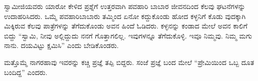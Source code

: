 ಸ್ವಾಮೀಜಿಯವರು ಯಾರೋ ಕೇಳಿದ ಪ್ರಶ್ನೆಗೆ ಉತ್ತರವಾಗಿ ಪವಹಾರಿ ಬಾಬಾರ ಜೀವನದಿಂದ ಕೆಲವು ಘಟನೆಗಳನ್ನು ಉದಾಹರಿಸಿದರು. ಒಮ್ಮೆ ಪವಹಾರಿಬಾಬಾರು ತಮ್ಮಿಂದ ಏನೋ ಕದ್ದುಕೊಂಡು ಹೋದ ಕಳ್ಳನಿಗೆ ಕೊಡು ವುದಕ್ಕಾಗಿ ಮಿಕ್ಕಿರುವ ಕೆಲವು ಪಾತ್ರೆಗಳನ್ನು ತೆಗೆದುಕೊಂಡು ಅವನ ಹಿಂದೆ ಓಡಿದರು. ಕಳ್ಳನನ್ನು ಕಂಡಾದ ಮೇಲೆ ಅವನ ಕಾಲಿಗೆ ಬಿದ್ದು “ಸ್ವಾಮಿ, ನೀವು ಅಲ್ಲಿದ್ದುದು ನನಗೆ ಗೊತ್ತಾಗಲಿಲ್ಲ. ಇವುಗಳನ್ನೂ ತೆಗೆದುಕೊಳ್ಳಿ. ಇವೂ ನಿಮ್ಮವು. ನಿಮ್ಮ ಮಗು ನಾನು. ದಯವಿಟ್ಟು ಕ್ಷಮಿಸಿ” ಎಂದು ಬೇಡಿಕೊಂಡರು.

ಮತ್ತೊಮ್ಮೆ ನಾಗರಹಾವು ಇವರನ್ನು ಕಚ್ಚಿ ಪ್ರಜ್ಞೆ ತಪ್ಪಿ ಬಿದ್ದರು. ಸಂಜೆ ಪ್ರಜ್ಞೆ ಬಂದ ಮೇಲೆ “ಪ್ರೇಮಿಯಿಂದ ಒಬ್ಬ ದೂತ ಬಂದಿದ್ದ” ಎಂದರು.

